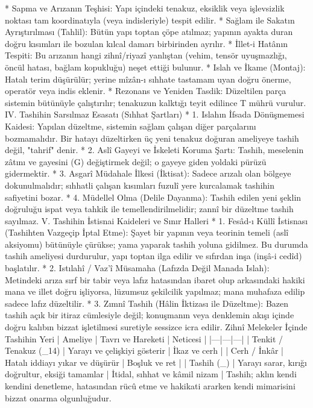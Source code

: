 \documentclass[11pt,a4paper]{article}
\begin{document}
 * Sapma ve Arızanın Teşhisi: Yapı içindeki tenakuz, eksiklik veya işlevsizlik noktası tam koordinatıyla (veya indisleriyle) tespit edilir.
 * Sağlam ile Sakatın Ayrıştırılması (Tahlil): Bütün yapı toptan çöpe atılmaz; yapının ayakta duran doğru kısımları ile bozulan kılcal damarı birbirinden ayrılır.
 * İllet-i Hatânın Tespiti: Bu arızanın hangi zihnî/riyazî yanlıştan (vehim, tensör uyuşmazlığı, öncül hatası, bağlam kopukluğu) neşet ettiği bulunur.
 * Islah ve İkame (Montaj): Hatalı terim düşürülür; yerine mîzân-ı sıhhate tastamam uyan doğru önerme, operatör veya indis eklenir.
 * Rezonans ve Yeniden Tasdik: Düzeltilen parça sistemin bütünüyle çalıştırılır; tenakuzun kalktığı teyit edilince T  mührü vurulur.
IV. Tashihin Sarsılmaz Esasatı (Sıhhat Şartları)
 * 1. Islahın İfsada Dönüşmemesi Kaidesi:
   Yapılan düzeltme, sistemin sağlam çalışan diğer parçalarını bozmamalıdır. Bir hatayı düzeltirken üç yeni tenakuz doğuran ameliyeye tashih değil, "tahrif" denir.
 * 2. Aslî Gayeyi ve İskeleti Koruma Şartı:
   Tashih, meselenin zâtını ve gayesini (G) değiştirmek değil; o gayeye giden yoldaki pürüzü gidermektir.
 * 3. Asgarî Müdahale İlkesi (İktisat):
   Sadece arızalı olan bölgeye dokunulmalıdır; sıhhatli çalışan kısımları fuzulî yere kurcalamak tashihin safiyetini bozar.
 * 4. Müdellel Olma (Delile Dayanma):
   Tashih edilen yeni şeklin doğruluğu ispat veya tahkik ile temellendirilmelidir; zannî bir düzeltme tashih sayılmaz.
V. Tashihin İstisnai Kaideleri ve Sınır Halleri
 * 1. Fesâd-ı Küllî İstisnası (Tashihten Vazgeçip İptal Etme):
   Şayet bir yapının veya teorinin temeli (aslî aksiyomu) bütünüyle çürükse; yama yaparak tashih yoluna gidilmez. Bu durumda tashih ameliyesi durdurulur, yapı toptan ilga edilir ve sıfırdan inşa (inşâ-i cedîd) başlatılır.
 * 2. Istılahî / Vaz'î Müsamaha (Lafızda Değil Manada Islah):
   Metindeki arıza sırf bir tabir veya lafız hatasından ibaret olup arkasındaki hakiki mana ve illet doğru işliyorsa, lüzumsuz şekilcilik yapılmaz; mana muhafaza edilip sadece lafız düzeltilir.
 * 3. Zımnî Tashih (Hâlin İktizası ile Düzeltme):
   Bazen tashih açık bir itiraz cümlesiyle değil; konuşmanın veya denklemin akışı içinde doğru kalıbın bizzat işletilmesi suretiyle sessizce icra edilir.
Zihnî Melekeler İçinde Tashihin Yeri
| Ameliye | Tavrı ve Hareketi | Neticesi |
|---|---|---|
| Tenkit / Tenakuz (_{14}) | Yarayı ve çelişkiyi gösterir | İkaz ve cerh |
| Cerh / İnkâr | Hatalı iddiayı yıkar ve düşürür | Boşluk ve ret |
| Tashih (_{}) | Yarayı sarar, kırığı doğrultur, eksiği tamamlar | İtidal, sıhhat ve kâmil nizam |
Tashih; aklın kendi kendini denetleme, hatasından rücû etme ve hakikati ararken kendi mimarisini bizzat onarma olgunluğudur.
\end{document}
